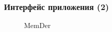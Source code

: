\documentclass[xetex,mathserif,serif, xcolor=table]{beamer}
\begin{document}
	\begin{frame}
		\frametitle{Интерфейс приложения (2)}
		\begin{figure}[h]
            \caption{MemDer}
            \label{fig:image}
        \end{figure}
	\end{frame}
	
\end{document}
